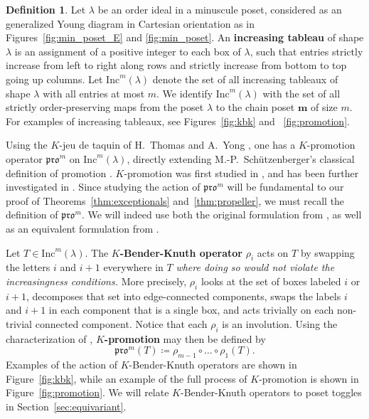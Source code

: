 \documentclass[12pt]{amsart}
\theoremstyle{definition}
\newtheorem{definition}[theorem]{Definition}
\theoremstyle{remark}
\numberwithin{equation}{section}
\newcommand{\inc}{\ensuremath{\mathrm{Inc}}}
\newcommand{\pro}{\mathfrak{pro}}
\begin{document}
\begin{definition}
Let $\lambda$ be an order ideal in a minuscule poset, considered as an generalized Young diagram in Cartesian orientation as in Figures~\ref{fig:min_poset_E} and \ref{fig:min_poset}. An {\bf increasing tableau} of shape $\lambda$ is an assignment of a positive integer to each box of $\lambda$, such that entries strictly increase from left to right along rows and strictly increase from bottom to top going up columns. Let $\inc^m(\lambda)$ denote the set of all increasing tableaux of shape $\lambda$ with all entries at most $m$. We identify $\inc^m(\lambda)$ with the set of all strictly order-preserving maps from the poset $\lambda$ to the chain poset $\mathbf{m}$ of size $m$. For examples of increasing tableaux, see Figures~\ref{fig:kbk} and ~\ref{fig:promotion}.
\end{definition}

Using the $K$-jeu de taquin of H.~Thomas and A.~Yong \cite{Thomas.Yong:K}, one has a $K$-promotion operator $\pro^m$ on $\inc^m(\lambda)$, directly extending M.-P.~Sch\"utzenberger's classical definition of promotion \cite{Schutzenberger:promotion}. $K$-promotion was first studied in \cite{Pechenik}, and has been further investigated in \cite{BPS, Pressey.Stokke.Visentin, Rhoades:skein, DPS, Pechenik:frames,Vorland}. Since studying the action of $\pro^m$ will be fundamental to our proof of Theorems~\ref{thm:exceptionals} and~\ref{thm:propeller}, we must recall the definition of $\pro^m$. 
We will indeed use both the original formulation from \cite{Pechenik}, as well as an equivalent formulation from \cite[Proposition~2.4]{DPS}.

Let $T \in \inc^m(\lambda)$. The {\bf $K$-Bender-Knuth operator} $\rho_i$ acts on $T$ by swapping the letters $i$ and $i+1$ everywhere in $T$ \emph{where doing so would not violate the increasingness conditions.} More precisely, $\rho_i$ looks at the set of boxes labeled $i$ or $i+1$, decomposes that set into edge-connected components, swaps the labels $i$ and $i+1$ in each component that is a single box, and acts trivially on each non-trivial connected component. 
Notice that each $\rho_i$ is an involution.
Using the characterization of \cite[Proposition~2.4]{DPS}, {\bf $K$-promotion} may then be defined by
\[
\pro^m(T) \coloneqq \rho_{m-1} \circ \dots \circ \rho_1(T).
\]
Examples of the action of $K$-Bender-Knuth operators are shown in Figure~\ref{fig:kbk}, while an example of the full process of $K$-promotion is shown in Figure~\ref{fig:promotion}. We will relate $K$-Bender-Knuth operators to poset toggles in Section~\ref{sec:equivariant}.
\end{document}
